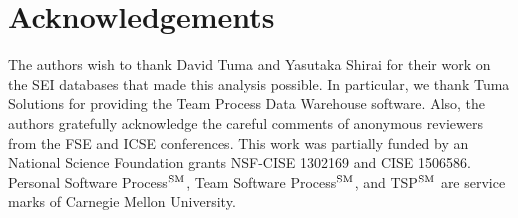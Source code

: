 \documentclass[smallcondensed]{svjour3}
\begin{document}
  
 


\section*{Acknowledgements}
The authors wish to thank  David Tuma and  Yasutaka Shirai for their work on the SEI databases
that made this analysis possible.
In particular, we thank Tuma Solutions for providing the Team Process Data Warehouse software.
Also, the authors gratefully acknowledge the careful comments of anonymous reviewers from the
FSE and ICSE conferences.
This work was partially funded by an National Science
Foundation grants NSF-CISE 1302169 and CISE 1506586.
Personal Software Process$\textsuperscript{SM}$, Team Software Process$\textsuperscript{SM}$, and TSP$\textsuperscript{SM}$ are service marks of Carnegie Mellon University.

 
\vspace*{0.5mm} 
\balance

 

\newpage
{}
 \setcounter{page}{1}
 

\end{document}
